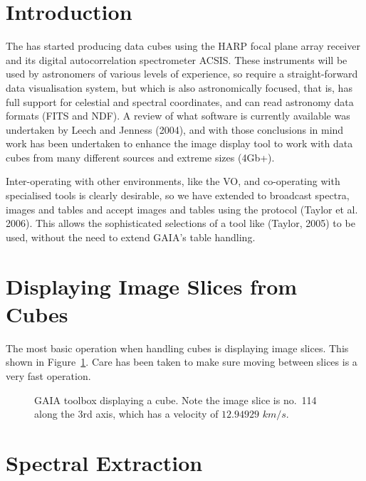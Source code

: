\documentclass[11pt,twoside]{article}  %
\begin{document}
\section{Introduction}

The  has started
producing data cubes using the HARP focal plane array receiver and its digital
autocorrelation spectrometer ACSIS. These instruments will be used by
astronomers of various levels of experience, so require a straight-forward
data visualisation system, but which is also astronomically focused, that is,
has full support for celestial and spectral coordinates, and can read
astronomy data formats (FITS and NDF). A review of what software is currently
available was undertaken by Leech and Jenness (2004), and with those
conclusions in mind work has been undertaken to enhance the 
image display tool to work with data cubes from many different sources and
extreme sizes (4Gb+).

Inter-operating with other environments, like the VO, and co-operating with
specialised tools is clearly desirable, so we have extended 
to broadcast spectra, images and tables and accept images and tables using the
protocol (Taylor et al. 2006). This allows the sophisticated selections of a
tool like
(Taylor, 2005) to be used, without the need to extend GAIA's
table handling.

\section{Displaying Image Slices from Cubes}

The most basic operation when handling cubes is displaying image slices. This
shown in Figure~\ref{D1.1-fig1}. Care has been taken to make sure moving
between slices is a very fast operation.

\begin{figure}
\caption{GAIA toolbox displaying a cube. Note the image slice is no.\ 114
along the 3rd axis, which has a velocity of $12.94929$ $km/s$.
}
\label{D1.1-fig1}
\end{figure}

\section{Spectral Extraction}
\end{document}
